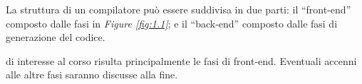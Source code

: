 \documentclass{subfiles}
\begin{document}
La struttura di un compilatore può essere suddivisa in due parti: il ``front-end'' composto dalle fasi in \emph{Figure \ref{fig:1.1}};
e il ``back-end'' composto dalle fasi di generazione del codice.


\begin{Note*}
    di interesse al corso risulta principalmente le fasi di front-end.
    Eventuali accenni alle altre fasi saranno discusse alla fine.
\end{Note*}
\end{document}
